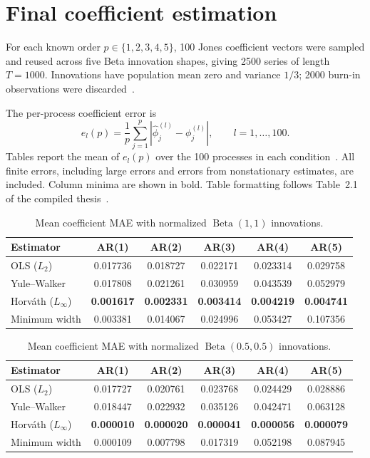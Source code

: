 \documentclass[a4paper,12pt]{scrartcl}
\begin{document}
\section*{Final coefficient estimation}
For each known order $p\in\{1,2,3,4,5\}$, 100 Jones coefficient vectors were
sampled and reused across five Beta innovation shapes, giving 2500 series of
length $T=1000$. Innovations have population mean zero and variance $1/3$;
2000 burn-in observations were discarded~\cite{experiment,implementation,jones}.

The per-process coefficient error is
\[
e_l(p)=\frac{1}{p}\sum_{j=1}^{p}
  \left|\widehat{\phi}^{(l)}_j-\phi^{(l)}_j\right|,
\qquad l=1,\ldots,100.
\]
Tables report the mean of $e_l(p)$ over the 100 processes in each
condition~\cite{implementation}. All finite errors, including large errors and
errors from nonstationary estimates, are included. Column minima are shown in
bold. Table formatting follows Table~2.1 of the compiled thesis~\cite{style}.
\begin{table}[H]
\centering
\caption{Mean coefficient MAE with normalized $\operatorname{Beta}(1,1)$ innovations.}
\label{tab:uniform}
\begin{tabular}{lccccc}
\toprule
Estimator & AR(1) & AR(2) & AR(3) & AR(4) & AR(5) \\
\midrule
OLS ($L_2$)
& 0.017736
& 0.018727
& 0.022171
& 0.023314
& 0.029758 \\
Yule--Walker
& 0.017808
& 0.021261
& 0.030959
& 0.043539
& 0.052979 \\
Horv\'ath ($L_{\infty}$)
& \textbf{0.001617}
& \textbf{0.002331}
& \textbf{0.003414}
& \textbf{0.004219}
& \textbf{0.004741} \\
Minimum width
& 0.003381
& 0.014067
& 0.024996
& 0.053427
& 0.107356 \\
\bottomrule
\end{tabular}
\end{table}
\begin{table}[H]
\centering
\caption{Mean coefficient MAE with normalized $\operatorname{Beta}(0.5,0.5)$ innovations.}
\label{tab:symmetric_u}
\begin{tabular}{lccccc}
\toprule
Estimator & AR(1) & AR(2) & AR(3) & AR(4) & AR(5) \\
\midrule
OLS ($L_2$)
& 0.017727
& 0.020761
& 0.023768
& 0.024429
& 0.028886 \\
Yule--Walker
& 0.018447
& 0.022932
& 0.035126
& 0.042471
& 0.063128 \\
Horv\'ath ($L_{\infty}$)
& \textbf{0.000010}
& \textbf{0.000020}
& \textbf{0.000041}
& \textbf{0.000056}
& \textbf{0.000079} \\
Minimum width
& 0.000109
& 0.007798
& 0.017319
& 0.052198
& 0.087945 \\
\bottomrule
\end{tabular}
\end{table}
\end{document}
